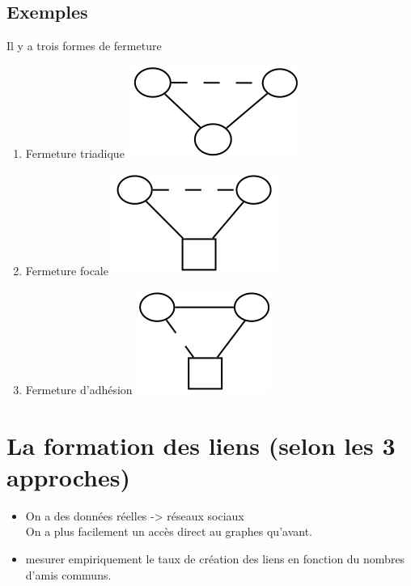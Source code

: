 \subsection{Exemples}
Il y a trois formes de fermeture
\begin{enumerate}
\item Fermeture triadique \includegraphics[scale=0.1]{images/FermetureTriadique.png}
\item Fermeture focale \includegraphics[scale=0.1]{images/FermetureFocale.png}
\item Fermeture d'adhésion \includegraphics[scale=0.1]{images/FermetureAdhesion.png}
\end{enumerate}

\section{La formation des liens (selon les 3 approches)}
\begin{itemize}
\item On a des données réelles -> réseaux sociaux \\
		On a plus facilement un accès direct au graphes qu'avant.
\item mesurer empiriquement le taux de création des liens en fonction du nombres d'amis communs.
\end{itemize}


